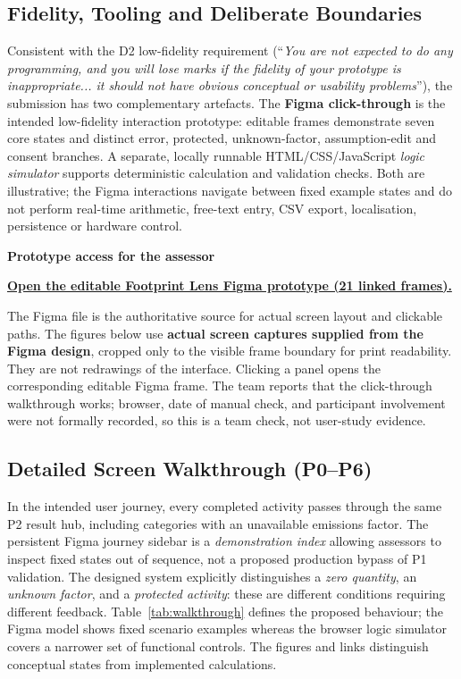 \documentclass[12pt,a4paper]{article}
\begin{document}
\subsection{Fidelity, Tooling and Deliberate Boundaries}
Consistent with the D2 low-fidelity requirement (``\emph{You are not expected to do any programming, and you will lose marks if the fidelity of your prototype is inappropriate... it should not have obvious conceptual or usability problems}''), the submission has two complementary artefacts. The \textbf{Figma click-through} is the intended low-fidelity interaction prototype: editable frames demonstrate seven core states and distinct error, protected, unknown-factor, assumption-edit and consent branches. A separate, locally runnable HTML/CSS/JavaScript \emph{logic simulator} supports deterministic calculation and validation checks. Both are illustrative; the Figma interactions navigate between fixed example states and do not perform real-time arithmetic, free-text entry, CSV export, localisation, persistence or hardware control.

\begin{keybox}
\textbf{\sffamily\color{Navy}Prototype access for the assessor}\par
\href{https://www.figma.com/design/L1kEH28shvU8494m2Y7EnT}{\sffamily\bfseries\color{Teal}Open the editable Footprint Lens Figma prototype (21 linked frames).}\par
The Figma file is the authoritative source for actual screen layout and clickable paths. The figures below use \textbf{actual screen captures supplied from the Figma design}, cropped only to the visible frame boundary for print readability. They are not redrawings of the interface. Clicking a panel opens the corresponding editable Figma frame. The team reports that the click-through walkthrough works; browser, date of manual check, and participant involvement were not formally recorded, so this is a team check, not user-study evidence.
\end{keybox}

\subsection{Detailed Screen Walkthrough (P0--P6)}
In the intended user journey, every completed activity passes through the same P2 result hub, including categories with an unavailable emissions factor. The persistent Figma journey sidebar is a \emph{demonstration index} allowing assessors to inspect fixed states out of sequence, not a proposed production bypass of P1 validation. The designed system explicitly distinguishes a \emph{zero quantity}, an \emph{unknown factor}, and a \emph{protected activity}: these are different conditions requiring different feedback. Table~\ref{tab:walkthrough} defines the proposed behaviour; the Figma model shows fixed scenario examples whereas the browser logic simulator covers a narrower set of functional controls. The figures and links distinguish conceptual states from implemented calculations.
\end{document}
